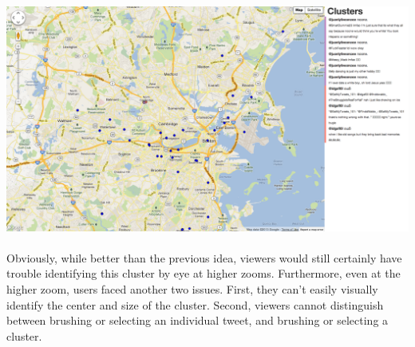 \documentclass[pdftex,12pt,a4paper]{article}
\begin{document}
\includegraphics[width=5.5in]{fail2.png} \\ \\
Obviously, while better than the previous idea, viewers would still certainly have trouble identifying this cluster by eye at higher zooms. Furthermore, even at the higher zoom, users faced another two issues. First, they can't easily visually identify the center and size of the cluster. Second, viewers cannot distinguish between brushing or selecting an individual tweet, and brushing or selecting a cluster.
\end{document}
